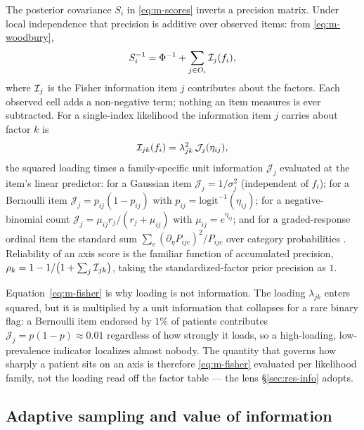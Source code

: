 The posterior covariance $S_i$ in \eqref{eq:m-scores} inverts a precision matrix.
Under local independence that precision is additive over observed items: from
\eqref{eq:m-woodbury},
\begin{equation}
  S_i^{-1}=\Phi^{-1}+\sum_{j\in O_i}\mathcal{I}_j(f_i),
  \label{eq:m-precision}
\end{equation}
where $\mathcal{I}_j$ is the Fisher information item $j$ contributes about the factors.
Each observed cell adds a non-negative term; nothing an item measures is ever
subtracted. For a single-index likelihood the information item $j$ carries about
factor $k$ is
\begin{equation}
  \mathcal{I}_{jk}(f_i)=\lambda_{jk}^{2}\,\mathcal{J}_j(\eta_{ij}),
  \label{eq:m-fisher}
\end{equation}
the squared loading times a family-specific unit information
$\mathcal{J}_j$ evaluated at the item's linear predictor: for a Gaussian item
$\mathcal{J}_j=1/\sigma_j^{2}$ (independent of $f_i$); for a Bernoulli item
$\mathcal{J}_j=p_{ij}(1-p_{ij})$ with $p_{ij}=\mathrm{logit}^{-1}(\eta_{ij})$; for
a negative-binomial count $\mathcal{J}_j=\mu_{ij}r_j/(r_j+\mu_{ij})$ with
$\mu_{ij}=e^{\eta_{ij}}$; and for a graded-response ordinal item the standard sum
$\sum_c (\partial_\eta P_{ijc})^2/P_{ijc}$ over category probabilities
\citep{samejima1969,embretsonreise2000}. Reliability of an axis score is the
familiar function of accumulated precision, $\rho_k=1-1/\big(1+\sum_j
\mathcal{I}_{jk}\big)$, taking the standardized-factor prior precision as $1$.

Equation~\eqref{eq:m-fisher} is why loading is not information. The loading
$\lambda_{jk}$ enters squared, but it is multiplied by a unit information that
collapses for a rare binary flag: a Bernoulli item endorsed by $1\%$ of patients
contributes $\mathcal{J}_j=p(1-p)\approx0.01$ regardless of how strongly it loads,
so a high-loading, low-prevalence indicator localizes almost nobody. The quantity
that governs how sharply a patient sits on an axis is therefore \eqref{eq:m-fisher}
evaluated per likelihood family, not the loading read off the factor table --- the
lens \S\ref{sec:res-info} adopts.

\subsection{Adaptive sampling and value of information}
\label{sec:m-voi}

